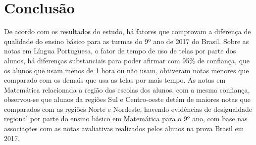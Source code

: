 
\chapter{Conclusão}

De acordo com os resultados do estudo, há fatores que comprovam a diferença de qualidade do ensino básico para as turmas do 9º ano de 2017 do Brasil. Sobre as notas em Língua Portuguesa, o fator de tempo de uso de telas por parte dos alunos, há diferenças substanciais para poder afirmar com 95\% de confiança, que os alunos que usam menos de 1 hora ou não usam, obtiveram notas menores que comparado com os demais que usa as telas por mais tempo. As notas em Matemática relacionada a região das escolas dos alunos, com a mesma confiança, observou-se que alunos da regiões Sul e Centro-oeste detém de maiores notas que comparados com as regiões Norte e Nordeste, havendo evidências de desigualdade regional por parte do ensino básico em Matemática para o 9º ano, com base nas associações com as notas avaliativas realizados pelos alunos na prova Brasil em 2017.